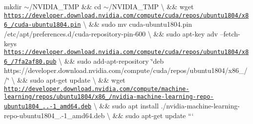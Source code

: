 mkdir $\sim$/\+N\+V\+I\+D\+I\+A\+\_\+\+T\+MP \&\& cd $\sim$/\+N\+V\+I\+D\+I\+A\+\_\+\+T\+MP \textbackslash{} \&\& wget \href{https://developer.download.nvidia.com/compute/cuda/repos/ubuntu1804/x86_64/cuda-ubuntu1804.pin}{\tt https\+://developer.\+download.\+nvidia.\+com/compute/cuda/repos/ubuntu1804/x86\+\_/cuda-\/ubuntu1804.\+pin} \textbackslash{} \&\& sudo mv cuda-\/ubuntu1804.\+pin /etc/apt/preferences.d/cuda-\/repository-\/pin-\/600 \textbackslash{} \&\& sudo apt-\/key adv --fetch-\/keys \href{https://developer.download.nvidia.com/compute/cuda/repos/ubuntu1804/x86_64/7fa2af80.pub}{\tt https\+://developer.\+download.\+nvidia.\+com/compute/cuda/repos/ubuntu1804/x86\+\_/7fa2af80.\+pub} \textbackslash{} \&\& sudo add-\/apt-\/repository \char`\"{}deb https\+://developer.\+download.\+nvidia.\+com/compute/cuda/repos/ubuntu1804/x86\+\_/ /\char`\"{} \textbackslash{} \&\& sudo apt-\/get update \textbackslash{} \&\& wget \href{http://developer.download.nvidia.com/compute/machine-learning/repos/ubuntu1804/x86_64/nvidia-machine-learning-repo-ubuntu1804_1.0.0-1_amd64.deb}{\tt http\+://developer.\+download.\+nvidia.\+com/compute/machine-\/learning/repos/ubuntu1804/x86\+\_/nvidia-\/machine-\/learning-\/repo-\/ubuntu1804\+\_..-\/1\+\_\+amd64.\+deb} \textbackslash{} \&\& sudo apt install ./nvidia-\/machine-\/learning-\/repo-\/ubuntu1804\+\_.-\/1\+\_\+amd64.\+deb \textbackslash{} \&\& sudo apt-\/get update ```


